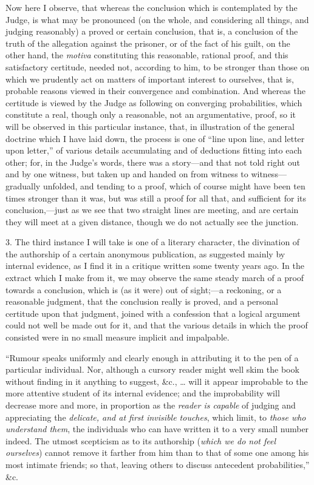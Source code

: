 Now here I observe, that whereas the conclusion which is
contemplated by the Judge, is what may be pronounced (on the whole,
and considering all things, and judging reasonably) a proved or
certain conclusion, that is, a conclusion of the truth of the
allegation against the prisoner, or of the fact of his guilt, on the
other hand, the \emph{motiva} constituting this reasonable, rational
proof, and this satisfactory certitude, needed not, according to him,
to be stronger than those on which we prudently act on matters of
important interest to ourselves, that is, probable reasons viewed in
their convergence and combination. And whereas the certitude is viewed
by the Judge as following on converging probabilities, which
constitute a real, though only a reasonable, not an argumentative,
proof, so it will be observed in this particular instance, that, in
illustration of the general doctrine which I have laid down, the
process is one of ``line upon line, and letter upon letter,''
of various details accumulating and of deductions fitting into each
other; for, in the Judge's words, there was a story—and that not
told right out and by one witness, but taken up and handed on from
witness to witness—gradually unfolded, and tending to a proof, which
of course might have been ten times stronger than it was, but was
still a proof for all that, and sufficient for its conclusion,—just
as we see that two straight lines are meeting, and are certain
they will meet at a given distance, though we do not actually see the
junction.

3. The third instance I will take is one of a literary character,
the divination of the authorship of a certain anonymous publication,
as suggested mainly by internal evidence, as I find it in a critique
written some twenty years ago. In the extract which I make from it, we
may observe the same steady march of a proof towards a conclusion,
which is (as it were) out of sight;—a reckoning, or a reasonable
judgment, that the conclusion really is proved, and a personal
certitude upon that judgment, joined with a confession that a logical
argument could not well be made out for it, and that the various
details in which the proof consisted were in no small measure implicit
and impalpable.

``Rumour speaks uniformly and clearly enough in attributing it
to the pen of a particular individual. Nor, although a cursory reader
might well skim the book without finding in it anything to suggest,
\&c., … will it appear improbable to the more attentive student
of its internal evidence; and the improbability will decrease more and
more, in proportion as the \emph{reader is capable} of judging and
appreciating the \emph{delicate, and at first invisible touches},
which limit, to \emph{those who understand them}, the individuals who
can have written it to a very small number indeed. The utmost
scepticism as to its authorship (\emph{which we do not feel ourselves})
cannot remove it farther from him than to that of some one among his
most intimate friends; so that, leaving others to discuss
antecedent probabilities,'' \&c.

